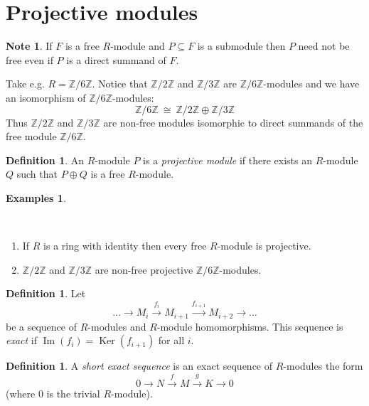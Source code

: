 \documentclass[12pt, letterpaper, oneside]{article}
\theoremstyle{plain}
\theoremstyle{definition}
\newtheorem{definition}[theorem]{Definition}
\newtheorem{examples}[theorem]{Examples}
\newtheorem{note}[theorem]{Note}
\newcommand{\lra}{\longrightarrow}
\newcommand{\Z}{{\mathbb Z}}
\renewcommand{\Im}{\operatorname{Im}}
\newcommand{\Ker}{\operatorname{Ker}}
\newcommand{\benu}{\begin{enumerate}}
\newcommand{\eenu}{\end{enumerate}}
\newcommand{\vs}{\vskip 5mm}
\begin{document}


\newpage
\section{Projective modules}
\label{SEC_PROJMOD} 


\begin{note}
If $F$ is a free $R$-module and $P\subseteq F$ is a submodule then
$P$ need not be free even if $P$ is a direct summand of $F$. 

Take  e.g. $R = \Z/6\Z$. Notice that $\Z/2\Z$ and $\Z/3\Z$ are $\Z/6\Z$-modules
and we have an isomorphism of $\Z/6\Z$-modules:
$$\Z/6\Z \ \cong \  \Z/2\Z \oplus \Z/3\Z$$
Thus $\Z/2\Z$ and $\Z/3\Z$ are non-free modules isomorphic to direct summands 
of the free module $\Z/6\Z$. 

\end{note}

\vs\vs


\begin{definition}
An $R$-module $P$ is a \emph{projective module} if there exists an $R$-module $Q$ 
such that $P\oplus Q$ is a free $R$-module. 
\end{definition}

\vs\vs

\begin{examples} \ 

\vskip -13mm

\ 
\benu
\item If $R$ is a ring with identity then every free $R$-module is projective. 
\item $\Z/2\Z$ and $\Z/3\Z$ are non-free projective $\Z/6\Z$-modules. 
\eenu 
\end{examples}

\vs\vs


\begin{definition}
Let
$${\dots} \lra M_{i} \overset{f_{i}}{\lra} M_{i+1}  \overset{f_{i+1}}{\lra} M_{i+2} \lra {\dots}$$
be a sequence of $R$-modules and $R$-module homomorphisms. This sequence is \emph{exact}
if $\Im(f_{i}) = \Ker(f_{i+1})$ for all $i$. 
\end{definition}


\vs\vs

\begin{definition}
A \emph{short exact sequence} is an exact sequence of $R$-modules the form 
$$ 0 \lra N \overset{f}{\lra} M \overset{g}{\lra} K \lra 0$$
(where $0$ is the trivial  $R$-module).
\end{definition}
\end{document}
